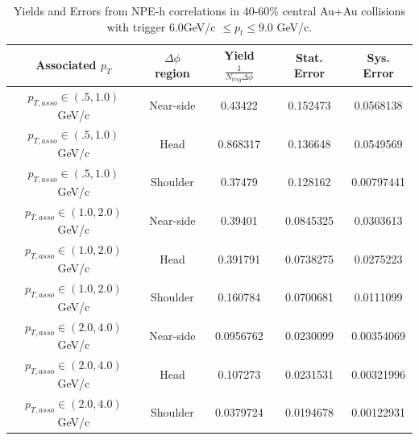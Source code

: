 \begin{table}
\centering
\begin{tabular}{|c|c|c|c|c|}
\hline
Associated $p_T$	& $\Delta\phi$ region & Yield $\frac{1}{N_{trig} \Delta\phi}$ & Stat. Error & Sys. Error\\
\hline
$p_{T,asso} \in(.5, 1.0)$ GeV/c  & Near-side & 0.43422 & 0.152473 & 0.0568138 \\
\hline
$p_{T,asso} \in(.5, 1.0)$ GeV/c  & Head & 0.868317 & 0.136648 & 0.0549569 \\
\hline
$p_{T,asso} \in(.5, 1.0)$ GeV/c  & Shoulder & 0.37479 & 0.128162 & 0.00797441 \\
\hline
$p_{T,asso} \in(1.0, 2.0)$ GeV/c  & Near-side & 0.39401 & 0.0845325 & 0.0303613 \\
\hline
$p_{T,asso} \in(1.0, 2.0)$ GeV/c  & Head & 0.391791 & 0.0738275 & 0.0275223 \\
\hline
$p_{T,asso} \in(1.0, 2.0)$ GeV/c  & Shoulder & 0.160784 & 0.0700681 & 0.0111099 \\
\hline
$p_{T,asso} \in(2.0, 4.0)$ GeV/c  & Near-side & 0.0956762 & 0.0230099 & 0.00354069 \\
\hline
$p_{T,asso} \in(2.0, 4.0)$ GeV/c  & Head & 0.107273 & 0.0231531 & 0.00321996 \\
\hline
$p_{T,asso} \in(2.0, 4.0)$ GeV/c  & Shoulder & 0.0379724 & 0.0194678 & 0.00122931 \\
\hline
\end{tabular}
\caption[Yields and Errors in Au+Au Correlations, 40-60\%, High Trigger]{Yields and Errors from NPE-h correlations in 40-60\% central Au+Au collisions with trigger $6.0 $GeV/c $\leq p_t \leq 9.0$ GeV/c.}
\label{tab:AuAuYieldPeriHigh}
\end{table} 

